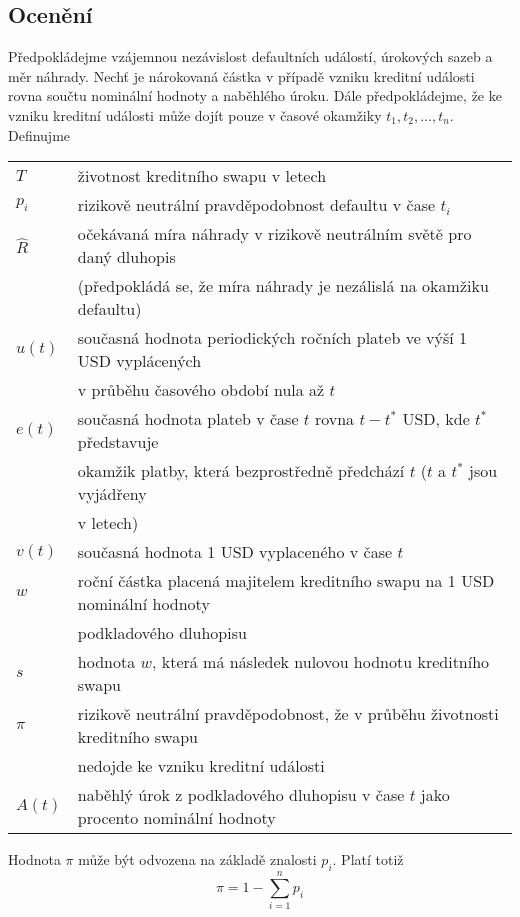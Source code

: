 \documentclass[a4paper]{book}
\begin{document}
\subsection{Ocenění}
Předpokládejme vzájemnou nezávislost defaultních událostí, úrokových sazeb a měr náhrady. Nechť je nárokovaná částka v případě vzniku kreditní události rovna součtu nominální hodnoty a naběhlého úroku. Dále předpokládejme, že ke vzniku kreditní události může dojít pouze v časové okamžiky $t_1, t_2, ..., t_n$. Definujme
\begin{center}
\begin{tabular}{l l}
$T$		& životnost kreditního swapu v letech \\
$p_i$		& rizikově neutrální pravděpodobnost defaultu v čase $t_i$ \\
$\hat{R}$	& očekávaná míra náhrady v rizikově neutrálním světě pro daný dluhopis \\
		& (předpokládá se, že míra náhrady je nezálislá na okamžiku defaultu) \\
$u(t)$		& současná hodnota periodických ročních plateb ve výší 1 USD vyplácených \\
		& v průběhu časového období nula až $t$ \\
$e(t)$		& současná hodnota plateb v čase $t$ rovna $t - t^*$ USD, kde $t^*$ představuje \\
		& okamžik platby, která bezprostředně předchází $t$ ($t$ a $t^*$ jsou vyjádřeny \\
		& v letech) \\
$v(t)$		& současná hodnota 1 USD vyplaceného v čase $t$ \\
$w$		& roční částka placená majitelem kreditního swapu na 1 USD nominální hodnoty \\
		& podkladového dluhopisu \\
$s$		& hodnota $w$, která má následek nulovou hodnotu kreditního swapu \\
$\pi$		& rizikově neutrální pravděpodobnost, že v průběhu životnosti kreditního swapu \\
		& nedojde ke vzniku kreditní události \\
$A(t)$		& naběhlý úrok z podkladového dluhopisu v čase $t$ jako procento nominální hodnoty \\
\end{tabular}
\end{center}
Hodnota $\pi$ může být odvozena na základě znalosti $p_i$. Platí totiž
\begin{equation*}
\pi = 1 - \sum^n_{i=1}p_i
\end{equation*}
\end{document}
